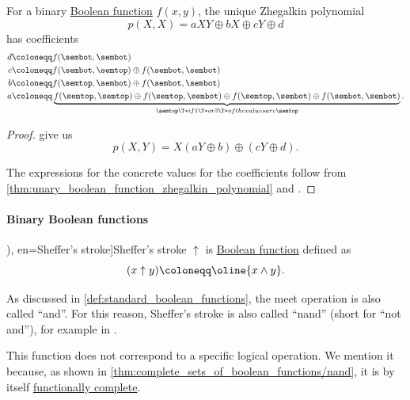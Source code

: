\begin{proposition}\label{thm:binary_boolean_function_zhegalkin_polynomial}
  For a binary \hyperref[def:boolean_function]{Boolean function} \( f(x, y) \), the unique Zhegalkin polynomial
  \begin{equation}\label{eq:thm:binary_boolean_function_zhegalkin_polynomial}
    p(X, X) = aXY \oplus bX \oplus cY \oplus d
  \end{equation}
  has coefficients
  \begin{align*}
    d &\coloneqq f(\sembot, \sembot) \\
    c &\coloneqq f(\sembot, \semtop) \oplus f(\sembot, \sembot) \\
    b &\coloneqq f(\semtop, \sembot) \oplus f(\sembot, \sembot) \\
    a &\coloneqq \underbrace{f(\semtop, \semtop) \oplus f(\semtop, \sembot) \oplus f(\semtop, \sembot) \oplus f(\sembot, \sembot)}_{\semtop \T*{if} 1 \T*{or} 3 \T*{of the values are} \semtop}.
  \end{align*}
\end{proposition}
\begin{proof}
   give us
  \begin{equation*}
    p(X, Y) = X(aY \oplus b) \oplus (cY \oplus d).
  \end{equation*}

  The expressions for the concrete values for the coefficients follow from \cref{thm:unary_boolean_function_zhegalkin_polynomial} and .
\end{proof}

\paragraph{Binary Boolean functions}

\begin{definition}\label{def:sheffers_stroke}
  \term[ru=штрих Шеффера (\cite[29]{Эдельман1975Логика}), en=Sheffer's stroke]{Sheffer's stroke} \( \uparrow \) is \hyperref[def:boolean_function]{Boolean function} defined as
  \begin{equation*}
    (x \uparrow y) \coloneqq \oline{x \wedge y}.
  \end{equation*}
\end{definition}
\begin{comments}
  \item As discussed in \cref{def:standard_boolean_functions}, the meet operation is also called \enquote{and}. For this reason, Sheffer's stroke is also called \enquote{nand} (short for \enquote{not and}), for example in \cite[40]{Hinman2005Logic}.

  \item This function does not correspond to a specific logical operation. We mention it because, as shown in \cref{thm:complete_sets_of_boolean_functions/nand}, it is by itself \hyperref[def:boolean_closure/complete]{functionally complete}.
\end{comments}

